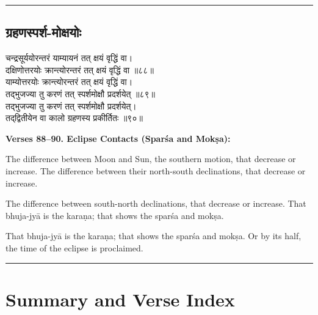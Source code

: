 \documentclass[11pt,a4paper]{article}
\newcommand{\longline}{\noindent\rule{\textwidth}{0.4pt}}
\newcommand{\dev}[1]{{\devanagarifont #1}}
\newcommand{\sectsep}{\par\vspace{0.8em}\longline\vspace{0.8em}}
\begin{document}
\sectsep

\subsection{\dev{ग्रहणस्पर्श-मोक्षयोः}}

\begin{minipage}[t]{0.48\textwidth}
\small\devanagarifont
चन्द्रसूर्ययोरन्तरं याम्यायनं तत् क्षयं वृद्धिं वा।\\
दक्षिणोत्तरयोः क्रान्त्योरन्तरं तत् क्षयं वृद्धिं वा ॥८८॥\\[0.5em]
याम्योत्तरयोः क्रान्त्योरन्तरं तत् क्षयं वृद्धिं वा।\\
तद्‌भुजज्या तु करणं तत् स्पर्शमोक्षौ प्रदर्शयेत् ॥८९॥\\[0.5em]
तद्‌भुजज्या तु करणं तत् स्पर्शमोक्षौ प्रदर्शयेत्।\\
तद्‌द्वितीयेन वा कालो ग्रहणस्य प्रकीर्तितः ॥९०॥
\end{minipage}%
\hfill
\begin{minipage}[t]{0.48\textwidth}
\small
\textbf{Verses 88--90. Eclipse Contacts (Spar\'sa and Mok\d{s}a):}

The difference between Moon and Sun, the southern motion, that decrease or increase. The difference between their north-south declinations, that decrease or increase.

The difference between south-north declinations, that decrease or increase. That bhuja-jy\=a is the kara\d{n}a; that shows the spar\'sa and mok\d{s}a.

That bhuja-jy\=a is the kara\d{n}a; that shows the spar\'sa and mok\d{s}a. Or by its half, the time of the eclipse is proclaimed.
\end{minipage}

\sectsep

\section*{Summary and Verse Index}
\end{document}
